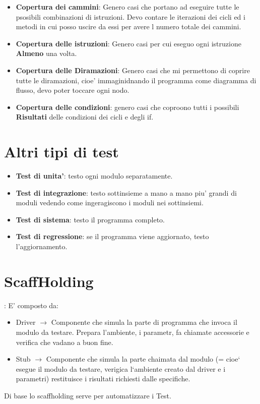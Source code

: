 \documentclass[\main/main.tex]{subfiles}
\begin{document}
\begin{itemize}
\item \textbf{Copertura dei cammini}: Genero casi che portano ad eseguire tutte le psosibili combinazioni di istruzioni.
Devo contare le iterazioni dei cicli ed i metodi in cui posso uscire da essi per avere l numero totale dei cammini.
\item \textbf{Copertura delle istruzioni}: Genero casi per cui eseguo ogni istruzione \textbf{Almeno} una volta.
\item \textbf{Copertura delle Diramazioni}: Genero casi che mi permettono di coprire tutte le diramazioni, cioe' immaginidnando il programma come diagramma di flusso, devo poter toccare ogni nodo.
\item \textbf{Copertura delle condizioni}: genero casi che coproono tutti i possibili \textbf{Risultati} delle condizioni dei cicli e degli if.
\end{itemize}

\section{Altri tipi di test}

\begin{itemize}
\item \textbf{Test di unita'}: testo ogni modulo separatamente.
\item \textbf{Test di integrazione}: testo sottinsieme a mano a mano piu' grandi di moduli vedendo come ingeragiscono i moduli nei sottinsiemi.
\item \textbf{Test di sistema}: testo il programma completo.
\item \textbf{Test di regressione}: se il programma viene aggiornato, testo l'aggiornamento.
\end{itemize}

\section{ScaffHolding}:
E' composto da:
\begin{itemize}

\item Driver $\longrightarrow$ Componente che simula la parte di programma che invoca il modulo da testare. Prepara l'ambiente, i parametr, fa chiamate accessorie e verifica che vadano a buon fine.
\item Stub  $\longrightarrow$  Componente che simula la parte chaimata dal modulo (= cioe` esegue il modulo da testare, verigica l`ambiente creato dal driver e i parametri) restituisce i risultati richiesti dalle specifiche.
\end{itemize}
Di base lo scaffholding serve per automatizzare i Test.
\end{document}
